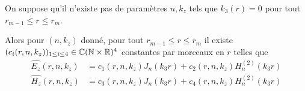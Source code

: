   \begin{prop}
    On suppose qu'il n'existe pas de paramètres \(n,k_z\) tels que \(k_3(r) = 0\) pour tout \(r_{m-1}\le r \le r_m\).

    Alors pour \((n,k_z)\) donné, pour tout \(r_{m-1}\le r \le r_m\) il existe \((c_i(r,n,k_z))_{1\le i\le 4} \in \mathbb C(\mathbb N\times\mathbb R)^4\) constantes par morceaux en \(r\) telles que 
    \begin{subequations}
      \begin{align}
        \hat{E_z}(r,n,k_z) &= c_1(r,n,k_z) J_n\left(k_3r\right) + c_2(r,n,k_z) H_n^{(2)}\left(k_3r\right)
        \\
        \hat{H_z}(r,n,k_z) &= c_3(r,n,k_z) J_n\left(k_3r\right) + c_4(r,n,k_z) H_n^{(2)}\left(k_3r\right)
      \end{align}
    \end{subequations}

  \end{prop}

